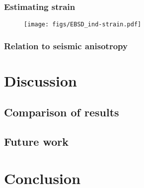 \documentclass[a4paper,12pt]{report}
\numberwithin{equation}{chapter}
\begin{document}
\subsection{Estimating strain}

\begin{figure}[h]
  \centering
    \texttt{[image: figs/EBSD\_ind-strain.pdf]}
  \caption[Relationship of indices to strain (quartz EBSD)]{} 
  \label{fig:indices_vs_strain_qtz_EBSD}
\end{figure} 

\subsection{Relation to seismic anisotropy}
 
\chapter{Discussion} \label{chap:discussion}
\vspace{-1cm}

\section{Comparison of results}

\section{Future work}


\chapter{Conclusion} \label{chap:conclusion}
\vspace{-1cm}
\end{document}

